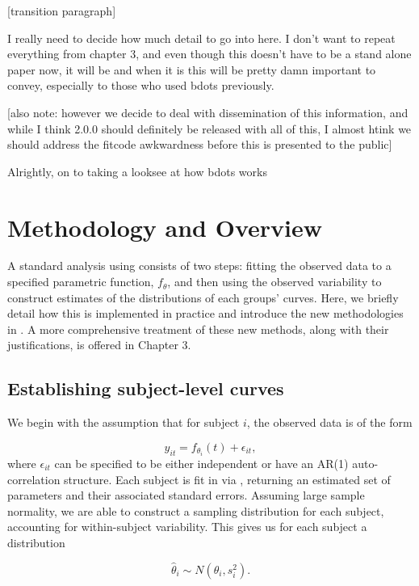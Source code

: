 [transition paragraph]

I really need to decide how much detail to go into here. I don't want to repeat everything from chapter 3, and even though this doesn't have to be a stand alone paper now, it will be and when it is this will be pretty damn important to convey, especially to those who used bdots previously.

[also note: however we decide to deal with dissemination of this information, and while I think 2.0.0 should definitely be released with all of this, I almost htink we should address the fitcode awkwardness before this is presented to the public]

Alrightly, on to taking a looksee at how bdots works


\section{Methodology and Overview} 

A standard analysis using  consists of two steps: fitting the observed data to a specified parametric function, $f_\theta$, and then using the observed variability to construct estimates of the distributions of each groups' curves.  Here, we briefly detail how this is implemented in practice and introduce the new methodologies in . A more comprehensive treatment of these new methods, along with their justifications, is offered in Chapter 3. 



\subsection{Establishing subject-level curves}

We begin with the assumption that for subject $i$, the observed data is of the form

\begin{equation}\label{eq:mean_structure}
y_{it} = f_{\theta_i}(t) + \epsilon_{it},
\end{equation}
where $\epsilon_{it}$ can be specified to be either independent or have an AR(1) auto-correlation structure. Each subject is fit in  via , returning an estimated set of parameters and their associated standard errors. Assuming large sample normality, we are able to construct a sampling distribution for each subject, accounting for within-subject variability. This gives us for each subject a distribution

\begin{equation}
\hat{\theta}_i \sim N(\theta_i, s_i^2).
\end{equation}

